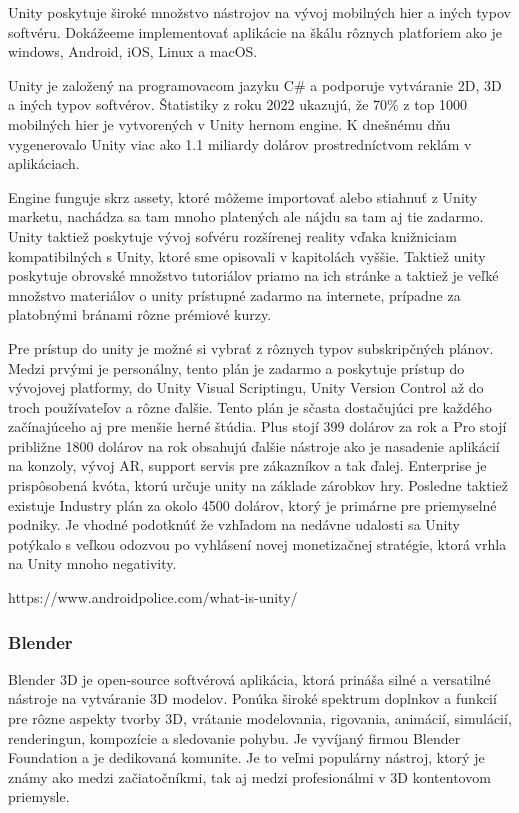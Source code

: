 Unity poskytuje široké množstvo nástrojov na vývoj mobilných hier a iných typov softvéru. Dokážeeme implementovať aplikácie na škálu rôznych platforiem ako je windows, Android, iOS, Linux a macOS. 

Unity je založený na programovacom jazyku C\# a podporuje vytváranie 2D, 3D a iných typov softvérov. Štatistiky z roku 2022 ukazujú, že 70\% z top 1000 mobilných hier je vytvorených v Unity hernom engine. K dnešnému dňu vygenerovalo Unity viac ako 1.1 miliardy dolárov prostredníctvom reklám v aplikáciach. 

Engine funguje skrz assety, ktoré môžeme importovať alebo stiahnuť z Unity marketu, nachádza sa tam mnoho platených ale nájdu sa tam aj tie zadarmo. Unity taktiež poskytuje vývoj sofvéru rozšírenej reality vďaka knižniciam kompatibilných s Unity, ktoré sme opisovali v kapitolách vyššie. Taktiež unity poskytuje obrovské množstvo tutoriálov priamo na ich stránke a taktiež je veľké množstvo materiálov o unity prístupné zadarmo na internete, prípadne za platobnými bránami rôzne prémiové kurzy.

Pre prístup do unity je možné si vybrať z rôznych typov subskripčných plánov. Medzi prvými je personálny, tento plán je zadarmo a poskytuje prístup do vývojovej platformy, do Unity Visual Scriptingu, Unity Version Control až do troch používateľov a rôzne ďalšie. Tento plán je sčasta dostačujúci pre každého začínajúceho aj pre menšie herné štúdia. Plus stojí 399 dolárov za rok a Pro stojí približne 1800 dolárov na rok obsahujú ďalšie nástroje ako je nasadenie aplikácií na konzoly, vývoj AR, support servis pre zákazníkov a tak ďalej. Enterprise je prispôsobená kvóta, ktorú určuje unity na základe zárobkov hry. Posledne taktiež existuje Industry plán za okolo 4500 dolárov, ktorý je primárne pre priemyselné podniky. Je vhodné podotknúť že vzhľadom na nedávne udalosti sa Unity potýkalo s veľkou odozvou po vyhlásení novej monetizačnej stratégie, ktorá vrhla na Unity mnoho negativity.  

https://www.androidpolice.com/what-is-unity/

\subsubsection{Blender}

Blender 3D je open-source softvérová aplikácia, ktorá prináša silné a versatilné nástroje na vytváranie 3D modelov. Ponúka široké spektrum doplnkov a funkcií pre rôzne aspekty tvorby 3D, vrátanie modelovania, rigovania, animácií, simulácií, renderingun, kompozície a sledovanie pohybu. Je vyvíjaný firmou Blender Foundation a je dedikovaná komunite. Je to veľmi populárny nástroj, ktorý je známy ako medzi začiatočníkmi, tak aj medzi profesionálmi v 3D kontentovom priemysle. 

